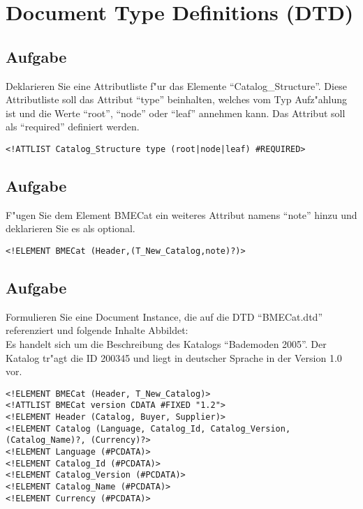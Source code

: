 

\section{Document Type Definitions (DTD)}


\subsection{Aufgabe}
Deklarieren Sie eine Attributliste f"ur das Elemente "`Catalog\_Structure"'.
Diese Attributliste soll das Attribut "`type"' beinhalten, welches vom Typ Aufz"ahlung ist und die Werte "`root"', "`node"' oder "`leaf"' annehmen kann.
Das Attribut soll als "`required"' definiert werden.\\

\lstset{style=customXML}
\begin{lstlisting}
<!ATTLIST Catalog_Structure type (root|node|leaf) #REQUIRED>
\end{lstlisting}

\subsection{Aufgabe}
F"ugen Sie dem Element BMECat ein weiteres Attribut namens "`note"' hinzu und deklarieren Sie es als optional.\\

\lstset{style=customXML}
\begin{lstlisting}
<!ELEMENT BMECat (Header,(T_New_Catalog,note)?)>
\end{lstlisting}


\subsection{Aufgabe}

Formulieren Sie eine Document Instance, die auf die DTD "`BMECat.dtd"' referenziert und folgende Inhalte Abbildet:\\
Es handelt sich um die Beschreibung des Katalogs "`Bademoden 2005"'.
Der Katalog tr"agt die ID 200345 und liegt in deutscher Sprache in der Version 1.0 vor.

\lstset{style=customXML} %
\begin{lstlisting}
<!ELEMENT BMECat (Header, T_New_Catalog)>
<!ATTLIST BMECat version CDATA #FIXED "1.2">
<!ELEMENT Header (Catalog, Buyer, Supplier)>
<!ELEMENT Catalog (Language, Catalog_Id, Catalog_Version, (Catalog_Name)?, (Currency)?>
<!ELEMENT Language (#PCDATA)>
<!ELEMENT Catalog_Id (#PCDATA)>
<!ELEMENT Catalog_Version (#PCDATA)>
<!ELEMENT Catalog_Name (#PCDATA)>
<!ELEMENT Currency (#PCDATA)>
\end{lstlisting}


